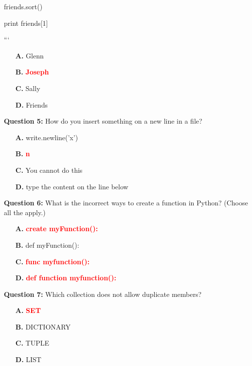 \documentclass[12pt,a4paper]{article}
\begin{document}
\newline
friends.sort()\newline

\newline
print friends[1]\newline

\newline
```

\begin{itemize}
    \item[\textbf{A.}] Glenn
    \item[\textbf{B.}] \textcolor{red}{\textbf{Joseph}}
    \item[\textbf{C.}] Sally
    \item[\textbf{D.}] Friends
\end{itemize}

\vspace{0.5cm}

\textbf{Question 5:} How do you insert something on a new line in a file?

\begin{itemize}
    \item[\textbf{A.}] write.newline('x')
    \item[\textbf{B.}] \textcolor{red}{\textbf{n}}
    \item[\textbf{C.}] You cannot do this
    \item[\textbf{D.}] type the content on the line below
\end{itemize}

\vspace{0.5cm}

\textbf{Question 6:} What is the incorrect ways to create a function in Python? (Choose all the apply.)

\begin{itemize}
    \item[\textbf{A.}] \textcolor{red}{\textbf{create myFunction():}}
    \item[\textbf{B.}] def myFunction():
    \item[\textbf{C.}] \textcolor{red}{\textbf{func myfunction():}}
    \item[\textbf{D.}] \textcolor{red}{\textbf{def function myfunction():}}
\end{itemize}

\vspace{0.5cm}

\textbf{Question 7:} Which collection does not allow duplicate members?

\begin{itemize}
    \item[\textbf{A.}] \textcolor{red}{\textbf{SET}}
    \item[\textbf{B.}] DICTIONARY
    \item[\textbf{C.}] TUPLE
    \item[\textbf{D.}] LIST
\end{itemize}
\end{document}
